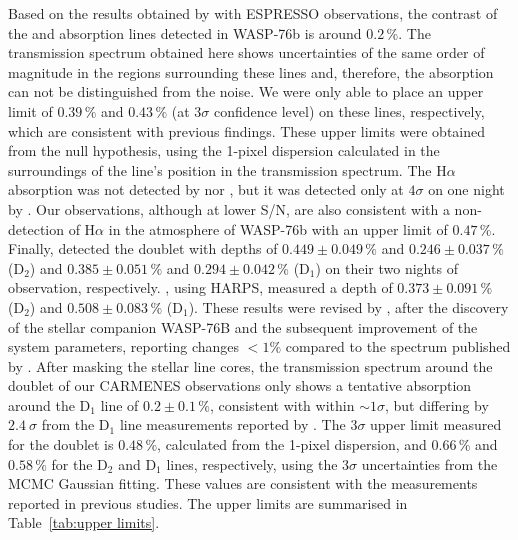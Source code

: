 \documentclass{aa}
\begin{document}
Based on the results obtained by \citet{Tabernero2020} with ESPRESSO observations, the contrast of the  and  absorption lines detected in WASP-76b is around $0.2\,\%$. The transmission spectrum obtained here shows uncertainties of the same order of magnitude in the regions surrounding these lines and, therefore, the absorption can not be distinguished from the noise. We were only able to place an upper limit of $0.39\,\%$ and $0.43\,\%$ (at $3\sigma$ confidence level) on these lines, respectively, which are consistent with previous findings. These upper limits were obtained from the null hypothesis, using the 1-pixel dispersion calculated in the surroundings of the line's position in the transmission spectrum. The H$\alpha$ absorption was not detected by \citet{Zak2019} nor \citet{Essen2020}, but it was detected only at $4\sigma$ on one night by \citet{Tabernero2020}. Our observations, although at lower S/N, are also consistent with a non-detection of H$\alpha$ in the atmosphere of WASP-76b with an upper limit of $0.47\,\%$. 
Finally, \citet{Tabernero2020} detected the  doublet with depths of $0.449\pm0.049\,\%$ and $0.246\pm0.037\,\%$ (D$_2$) and $0.385\pm0.051\,\%$ and $0.294\pm0.042\,\%$ (D$_1$) on their two nights of observation, respectively. 
\citet{Seidel2019}, using HARPS, measured a depth of $0.373\pm0.091\,\%$ (D$_2$) and $0.508\pm0.083\,\%$ (D$_1$). These results were revised by \citet{Seidel2021}, after the discovery of the stellar companion WASP-76B and the subsequent improvement of the system parameters, reporting changes $<1\%$ compared to the spectrum published by \citet{Seidel2019}. After masking the stellar line cores, the transmission spectrum around the  doublet of our CARMENES observations only shows a tentative absorption around the  D$_1$ line of $0.2\pm0.1\,\%$, consistent with \citet{Tabernero2020} within $\sim 1\sigma$, but differing by $2.4~\sigma$ from the D$_1$ line measurements reported by \citet{Seidel2019}. The $3\sigma$ upper limit measured for the  doublet is $0.48\,\%$, calculated from the 1-pixel dispersion, and $0.66\,\%$ and $0.58\,\%$ for the D$_2$ and D$_1$ lines, respectively, using the $3\sigma$ uncertainties from the MCMC Gaussian fitting. These values are consistent with the measurements reported in previous studies. The upper limits are summarised in Table~\ref{tab:upper limits}.
\end{document}
